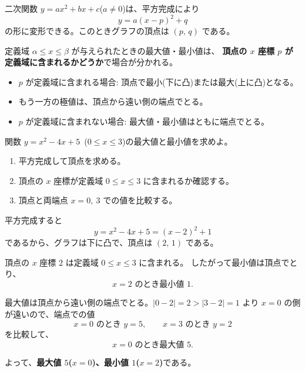 \documentclass[guided-example]{manabi}
\begin{document}
\ManabiMakeTitle

\begin{mnbconcept}[: 平方完成と頂点]
二次関数 $y = ax^2 + bx + c$($a \neq 0$)は、平方完成により
\[
  y = a(x - p)^2 + q
\]
の形に変形できる。このときグラフの頂点は $(p,\, q)$ である。

定義域 $\alpha \le x \le \beta$ が与えられたときの最大値・最小値は、
\textbf{頂点の $x$ 座標 $p$ が定義域に含まれるかどうか}で場合が分かれる。
\begin{itemize}[leftmargin=1.6em]
  \item $p$ が定義域に含まれる場合: 頂点で最小(下に凸)または最大(上に凸)となる。
  \item もう一方の極値は、頂点から遠い側の端点でとる。
  \item $p$ が定義域に含まれない場合: 最大値・最小値はともに端点でとる。
\end{itemize}
\end{mnbconcept}

\begin{mnbexample}
関数 $y = x^2 - 4x + 5$~($0 \le x \le 3$)の最大値と最小値を求めよ。
\end{mnbexample}

\begin{mnbstrategy}
\begin{enumerate}[leftmargin=1.8em]
  \item 平方完成して頂点を求める。
  \item 頂点の $x$ 座標が定義域 $0 \le x \le 3$ に含まれるか確認する。
  \item 頂点と両端点 $x = 0,\ 3$ での値を比較する。
\end{enumerate}
\end{mnbstrategy}

\begin{mnbsolution}
平方完成すると
\[
  y = x^2 - 4x + 5 = (x - 2)^2 + 1
\]
であるから、グラフは下に凸で、頂点は $(2,\, 1)$ である。

頂点の $x$ 座標 $2$ は定義域 $0 \le x \le 3$ に含まれる。
したがって最小値は頂点でとり、
\[
  x = 2 \text{ のとき最小値 } 1.
\]

最大値は頂点から遠い側の端点でとる。$|0 - 2| = 2 > |3 - 2| = 1$ より
$x = 0$ の側が遠いので、端点での値
\[
  x = 0 \text{ のとき } y = 5, \qquad x = 3 \text{ のとき } y = 2
\]
を比較して、
\[
  x = 0 \text{ のとき最大値 } 5.
\]

よって、\textbf{最大値 $5$($x = 0$)、最小値 $1$($x = 2$)}である。
\end{mnbsolution}
\end{document}
